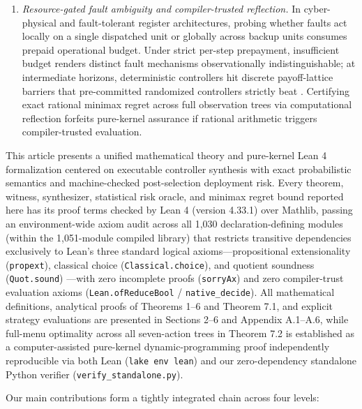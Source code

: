 \documentclass[11pt,a4paper]{article}
\begin{document}
\begin{enumerate}
  two latent beliefs that agree on every future observation test can
  assign opposite values to hidden-state safety predicates.
\item
  \emph{Resource-gated fault ambiguity and compiler-trusted reflection.}
  In cyber-physical and fault-tolerant register architectures, probing
  whether faults act locally on a single dispatched unit or globally
  across backup units consumes prepaid operational budget. Under strict
  per-step prepayment, insufficient budget renders distinct fault
  mechanisms observationally indistinguishable; at intermediate
  horizons, deterministic controllers hit discrete payoff-lattice
  barriers that pre-committed randomized controllers strictly beat
  \citep{vonNeumann1928, wald1950, savage1951}. Certifying exact
  rational minimax regret across full observation trees via
  computational reflection \citep{boutin1997, gregoireMahboubi2005}
  forfeits pure-kernel assurance if rational arithmetic triggers
  compiler-trusted evaluation.
\end{enumerate}

This article presents a unified mathematical theory and pure-kernel Lean
4 formalization \citep{mouraUllrich2021, mathlib2020} centered on
executable controller synthesis with exact probabilistic semantics and
machine-checked post-selection deployment risk. Every theorem, witness,
synthesizer, statistical risk oracle, and minimax regret bound reported
here has its proof terms checked by Lean 4 (version 4.33.1) over
Mathlib, passing an environment-wide axiom audit across all 1,030
declaration-defining modules (within the 1,051-module compiled library)
that restricts transitive dependencies exclusively to Lean's three
standard logical axioms---propositional extensionality
(\texttt{propext}), classical choice (\texttt{Classical.choice}), and
quotient soundness (\texttt{Quot.sound}) \citep{carneiro2019}---with
zero incomplete proofs (\texttt{sorryAx}) and zero compiler-trust
evaluation axioms (\texttt{Lean.ofReduceBool} /
\texttt{native\_decide}). All mathematical definitions, analytical
proofs of Theorems 1--6 and Theorem 7.1, and explicit strategy
evaluations are presented in Sections 2--6 and Appendix A.1--A.6, while
full-menu optimality across all seven-action trees in Theorem 7.2 is
established as a computer-assisted pure-kernel dynamic-programming proof
independently reproducible via both Lean (\texttt{lake\ env\ lean}) and
our zero-dependency standalone Python verifier
(\texttt{verify\_standalone.py}).

Our main contributions form a tightly integrated chain across four
levels:
\end{document}
